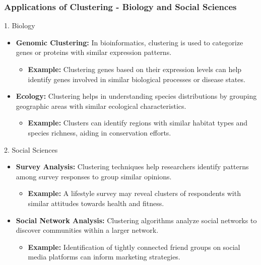 \documentclass[aspectratio=169]{beamer}
\begin{document}
\begin{frame}[fragile]
    \frametitle{Applications of Clustering - Biology and Social Sciences}
    \begin{block}{1. Biology}
        \begin{itemize}
            \item \textbf{Genomic Clustering:} In bioinformatics, clustering is used to categorize genes or proteins with similar expression patterns.
            \begin{itemize}
                \item \textbf{Example:} Clustering genes based on their expression levels can help identify genes involved in similar biological processes or disease states.
            \end{itemize}
            
            \item \textbf{Ecology:} Clustering helps in understanding species distributions by grouping geographic areas with similar ecological characteristics.
            \begin{itemize}
                \item \textbf{Example:} Clusters can identify regions with similar habitat types and species richness, aiding in conservation efforts.
            \end{itemize}
        \end{itemize}
    \end{block}

    \begin{block}{2. Social Sciences}
        \begin{itemize}
            \item \textbf{Survey Analysis:} Clustering techniques help researchers identify patterns among survey responses to group similar opinions.
            \begin{itemize}
                \item \textbf{Example:} A lifestyle survey may reveal clusters of respondents with similar attitudes towards health and fitness.
            \end{itemize}
            
            \item \textbf{Social Network Analysis:} Clustering algorithms analyze social networks to discover communities within a larger network.
            \begin{itemize}
                \item \textbf{Example:} Identification of tightly connected friend groups on social media platforms can inform marketing strategies.
            \end{itemize}
        \end{itemize}
    \end{block}
\end{frame}
\end{document}
